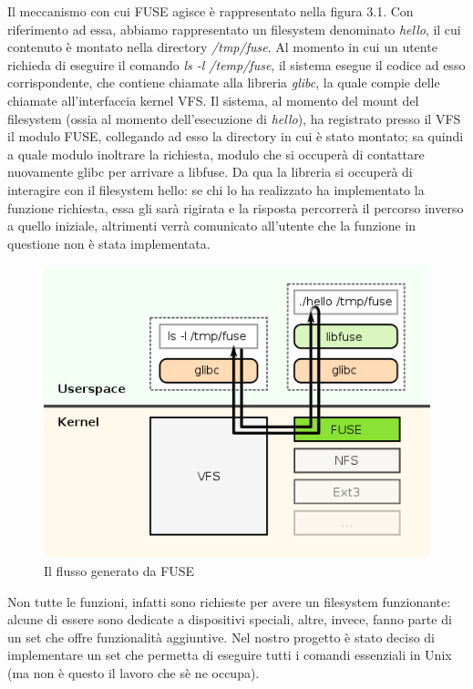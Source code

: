 Il meccanismo con cui FUSE agisce è rappresentato nella figura 3.1. Con riferimento ad essa, abbiamo rappresentato un filesystem denominato \emph{hello}, il cui contenuto è montato nella directory \emph{/tmp/fuse}. Al momento in cui un utente richieda di eseguire il comando \emph{ls -l /temp/fuse}, il sistema esegue il codice ad esso corrispondente, che contiene chiamate alla libreria \emph{glibc}, la quale compie delle chiamate all'interfaccia kernel VFS. Il sistema, al momento del mount del filesystem (ossia al momento dell'esecuzione di \emph{hello}), ha registrato presso il VFS il modulo FUSE, collegando ad esso la directory in cui è stato montato; sa quindi a quale modulo inoltrare la richiesta, modulo che si occuperà di contattare nuovamente glibc per arrivare a libfuse. Da qua la libreria si occuperà di interagire con il filesystem hello: se chi lo ha realizzato ha implementato la funzione richiesta, essa gli sarà rigirata e la risposta percorrerà il percorso inverso a quello iniziale, altrimenti verrà comunicato all'utente che la funzione in questione non è stata implementata. 
\begin{figure}
\centering
\includegraphics[scale=0.5]{./fuse.png}
\caption{Il flusso generato da FUSE}
\label{fig:1}
\end{figure}

Non tutte le funzioni, infatti sono richieste per avere un filesystem funzionante: alcune di essere sono dedicate a dispositivi speciali, altre, invece, fanno parte di un set che offre funzionalità aggiuntive. Nel nostro progetto è stato deciso di implementare un set che permetta di eseguire tutti i comandi essenziali in Unix (ma non è questo il lavoro che sè ne occupa).

